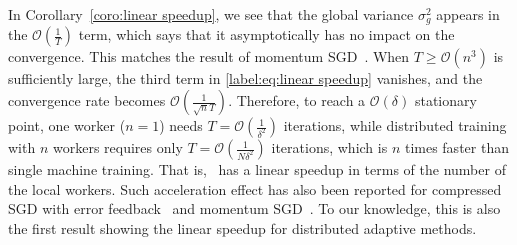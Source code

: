 \documentclass[11pt]{article}
\begin{document}
In Corollary~\ref{coro:linear speedup}, we see that the global variance $\sigma_g^2$ appears in the $\mathcal O(\frac{1}{T})$ term, which says that it asymptotically has no impact on the convergence. This matches the result of momentum SGD~\cite{Proc:Yu_ICML19}. When $T\geq \mathcal O(n^3)$ is sufficiently large, the third term in \eqref{label:eq:linear speedup} vanishes, and the convergence rate becomes $\mathcal O(\frac{1}{\sqrt nT})$. Therefore, to reach a $\mathcal O(\delta)$ stationary point, one worker ($n=1$) needs $T=\mathcal O(\frac{1}{\delta^2})$ iterations, while distributed training with $n$ workers requires only $T=\mathcal O(\frac{1}{N\delta^2})$ iterations, which is $n$ times faster than single machine training. That is, \algo\ has a linear speedup in terms of the number of the local workers. Such acceleration effect has also been reported for compressed SGD with error feedback~\cite{Proc:Zheng_NIPS19,jiang2018linear} and momentum SGD~\cite{Proc:Yu_ICML19}. To our knowledge, this is also the first result showing the linear speedup for distributed adaptive methods.






\end{document}
